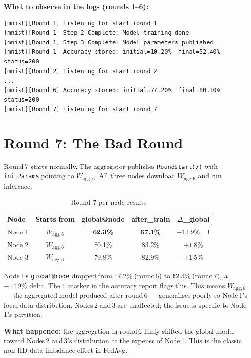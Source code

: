 \documentclass[11pt,a4paper]{article}
\newcommand{\Wagg}[1]{$W_{\text{agg},#1}$}
\newcommand{\badcell}[1]{\cellcolor{red!15}\textbf{#1}}
\begin{document}
\noindent\textbf{What to observe in the logs (rounds 1--6):}

\begin{lstlisting}[style=log]
[mnist][Round 1] Listening for start round 1
[mnist][Round 1] Step 2 Complete: Model training done
[mnist][Round 1] Step 3 Complete: Model parameters published
[mnist][Round 1] Accuracy stored: initial=10.20%  final=52.40%  status=200
[mnist][Round 2] Listening for start round 2
...
[mnist][Round 6] Accuracy stored: initial=77.20%  final=80.10%  status=200
[mnist][Round 7] Listening for start round 7
\end{lstlisting}

\newpage
\section{Round 7: The Bad Round}
\label{sec:round7}

Round\,7 starts normally.  The aggregator publishes
\texttt{RoundStart(7)} with \texttt{initParams} pointing to \Wagg{6}.
All three nodes download \Wagg{6} and run inference.

\begin{table}[H]
\centering
\small
\caption{Round 7 per-node results}
\begin{tabular}{l c c c c}
\toprule
\textbf{Node} & \textbf{Starts from} & \textbf{global@node} &
  \textbf{after\_train} & \textbf{$\Delta$\_global} \\
\midrule
Node 1 & \Wagg{6} & \badcell{62.3\%} & \badcell{67.1\%} &
  \badcell{$-14.9\%$ ~\texttt{!}} \\
Node 2 & \Wagg{6} & 80.1\% & 83.2\% & $+1.8\%$ \\
Node 3 & \Wagg{6} & 79.8\% & 82.9\% & $+1.5\%$ \\
\bottomrule
\end{tabular}
\end{table}

\begin{tcolorbox}[rollbackbox={Interpreting the drop on Node 1}]
  Node\,1's \texttt{global@node} dropped from $77.2\%$ (round\,6) to
  $62.3\%$ (round\,7), a $\mathbf{-14.9\%}$ delta.
  The \texttt{!} marker in the accuracy report flags this.
  This means \Wagg{6} --- the aggregated model produced after round\,6 ---
  generalises poorly to Node\,1's local data distribution.
  Nodes\,2 and\,3 are unaffected; the issue is specific to Node\,1's partition.

  \medskip
  \textbf{What happened:} the aggregation in round\,6 likely shifted the
  global model toward Nodes\,2 and\,3's distribution at the expense of
  Node\,1.  This is the classic non-IID data imbalance effect in FedAvg.
\end{tcolorbox}
\end{document}
